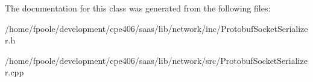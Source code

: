 The documentation for this class was generated from the following files\+:\begin{DoxyCompactItemize}
\item 
/home/fpoole/development/cpe406/saas/lib/network/inc/Protobuf\+Socket\+Serializer.\+h\item 
/home/fpoole/development/cpe406/saas/lib/network/src/Protobuf\+Socket\+Serializer.\+cpp\end{DoxyCompactItemize}
